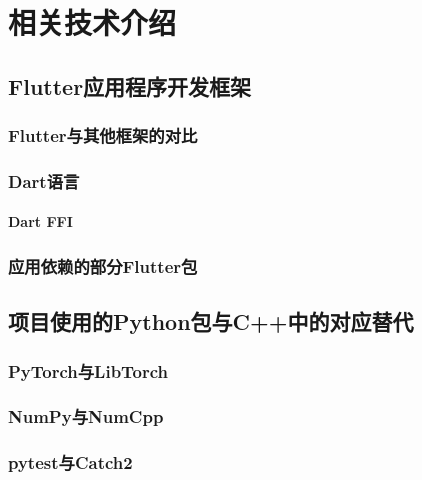 \chapter{相关技术介绍}\label{ch:tech}


\section{Flutter应用程序开发框架}\label{sec:flutter}


\subsection{Flutter与其他框架的对比}\label{subsec:flutter-compare}


\subsection{Dart语言}\label{subsec:dart}



\subsubsection{Dart FFI}\label{subsubsec:ffi}


\subsection{应用依赖的部分Flutter包}\label{subsec:flutter-packages}



\section{项目使用的Python包与C++中的对应替代}\label{sec:python-cpp-packages}


\subsection{PyTorch与LibTorch}\label{subsec:pytorch-libtorch}


\subsection{NumPy与NumCpp}\label{subsec:numpy-numcpp}


\subsection{pytest与Catch2}\label{subsec:pytest-catch2}



